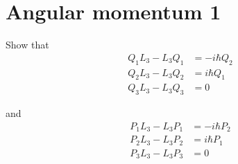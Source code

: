 

\section*{Angular momentum 1}

Show that
\begin{align*}
Q_1L_3-L_3Q_1&=-i\hbar Q_2
\\
Q_2L_3-L_3Q_2&=i\hbar Q_1
\\
Q_3L_3-L_3Q_3&=0
\end{align*}

and
\begin{align*}
P_1L_3-L_3P_1&=-i\hbar P_2
\\
P_2L_3-L_3P_2&=i\hbar P_1
\\
P_3L_3-L_3P_3&=0
\end{align*}


